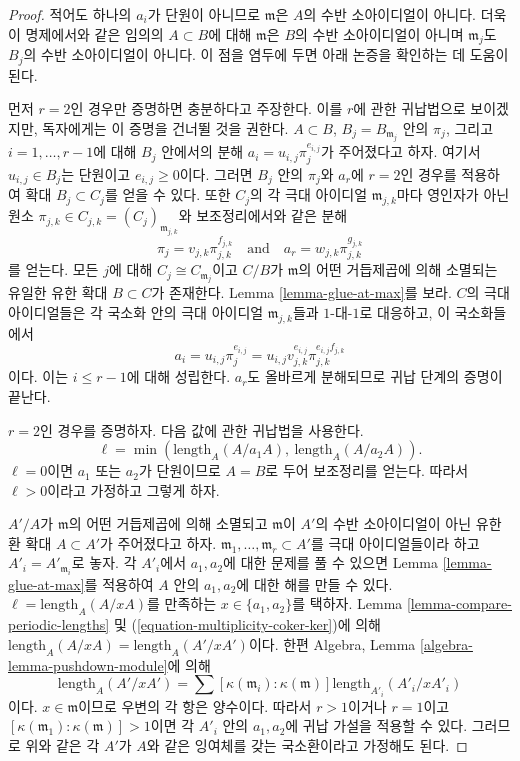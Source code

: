 \begin{proof}
적어도 하나의 $a_i$가 단원이 아니므로 $\mathfrak m$은 $A$의 수반
소아이디얼이 아니다. 더욱이 명제에서와 같은 임의의 $A \subset B$에
대해 $\mathfrak m$은 $B$의 수반 소아이디얼이 아니며 $\mathfrak m_j$도
$B_j$의 수반 소아이디얼이 아니다. 이 점을 염두에 두면 아래 논증을
확인하는 데 도움이 된다.

\medskip\noindent
먼저 $r = 2$인 경우만 증명하면 충분하다고 주장한다. 이를 $r$에 관한
귀납법으로 보이겠지만, 독자에게는 이 증명을 건너뛸 것을 권한다.
$A \subset B$, $B_j = B_{\mathfrak m_j}$ 안의 $\pi_j$, 그리고
$i = 1, \ldots, r - 1$에 대해 $B_j$ 안에서의 분해
$a_i = u_{i, j} \pi_j^{e_{i, j}}$가 주어졌다고 하자. 여기서
$u_{i, j} \in B_j$는 단원이고 $e_{i, j} \geq 0$이다. 그러면
$B_j$ 안의 $\pi_j$와 $a_r$에 $r = 2$인 경우를 적용하여 확대
$B_j \subset C_j$를 얻을 수 있다. 또한 $C_j$의 각 극대 아이디얼
$\mathfrak m_{j, k}$마다 영인자가 아닌 원소
$\pi_{j, k} \in C_{j, k} = (C_j)_{\mathfrak m_{j, k}}$와 보조정리에서와
같은 분해
$$
\pi_j = v_{j, k} \pi_{j, k}^{f_{j, k}}
\quad\text{and}\quad
a_r = w_{j, k} \pi_{j, k}^{g_{j, k}}
$$
를 얻는다. 모든 $j$에 대해 $C_j \cong C_{\mathfrak m_j}$이고
$C/B$가 $\mathfrak m$의 어떤 거듭제곱에 의해 소멸되는 유일한 유한
확대 $B \subset C$가 존재한다. Lemma \ref{lemma-glue-at-max}를 보라.
$C$의 극대 아이디얼들은 각 국소화 안의 극대 아이디얼
$\mathfrak m_{j, k}$들과 $1$-대-$1$로 대응하고, 이 국소화들에서
$$
a_i = u_{i, j} \pi_j^{e_{i, j}} =
u_{i, j} v_{j, k}^{e_{i, j}} \pi_{j, k}^{e_{i, j}f_{j, k}}
$$
이다. 이는 $i \leq r - 1$에 대해 성립한다. $a_r$도 올바르게
분해되므로 귀납 단계의 증명이 끝난다.

\medskip\noindent
$r = 2$인 경우를 증명하자. 다음 값에 관한 귀납법을 사용한다.
$$
\ell = \min(\text{length}_A(A/a_1A),\ \text{length}_A(A/a_2A)).
$$
$\ell = 0$이면 $a_1$ 또는 $a_2$가 단원이므로 $A = B$로 두어
보조정리를 얻는다. 따라서 $\ell > 0$이라고 가정하고 그렇게 하자.

\medskip\noindent
$A'/A$가 $\mathfrak m$의 어떤 거듭제곱에 의해 소멸되고
$\mathfrak m$이 $A'$의 수반 소아이디얼이 아닌 유한 환 확대
$A \subset A'$가 주어졌다고 하자. $\mathfrak m_1, \ldots, \mathfrak m_r \subset A'$를
극대 아이디얼들이라 하고 $A'_i = A'_{\mathfrak m_i}$로
놓자. 각 $A'_i$에서 $a_1, a_2$에 대한 문제를 풀 수 있으면 Lemma
\ref{lemma-glue-at-max}를 적용하여 $A$ 안의 $a_1, a_2$에 대한 해를
만들 수 있다. $\ell = \text{length}_A(A/xA)$를 만족하는
$x \in \{a_1, a_2\}$를 택하자. Lemma
\ref{lemma-compare-periodic-lengths} 
및 (\ref{equation-multiplicity-coker-ker})에 의해
$\text{length}_A(A/xA) = \text{length}_A(A'/xA')$이다. 한편 Algebra,
Lemma \ref{algebra-lemma-pushdown-module}에 의해
$$
\text{length}_A(A'/xA') =
\sum [\kappa(\mathfrak m_i) : \kappa(\mathfrak m)]
\text{length}_{A'_i}(A'_i/xA'_i)
$$
이다. $x \in \mathfrak m$이므로 우변의 각 항은 양수이다. 따라서
$r > 1$이거나 $r = 1$이고
$[\kappa(\mathfrak m_1) : \kappa(\mathfrak m)] > 1$이면 각 $A'_i$ 안의
$a_1, a_2$에 귀납 가설을 적용할 수 있다. 그러므로 위와 같은 각
$A'$가 $A$와 같은 잉여체를 갖는 국소환이라고 가정해도 된다.


\end{proof}
